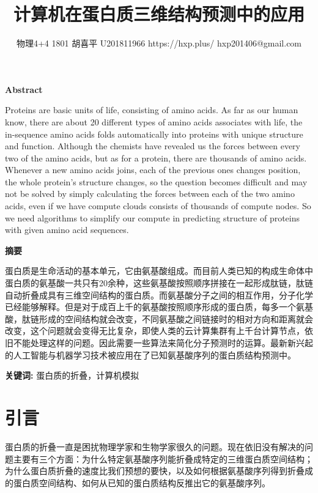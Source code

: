 \documentclass{article}
\author{物理4+4 1801 \quad 胡喜平 \quad U201811966 \quad https://hxp.plus/ \quad hxp201406@gmail.com}}
\date{}
\title{计算机在蛋白质三维结构预测中的应用}
\providecommand{\keywords}[1]
{
  \textbf{关键词:} #1
}
\begin{document}
\maketitle
\begin{center}
  \Large\textbf{Abstract}
\end{center}

Proteins are basic units of life, consisting of amino acids. As far as our human know, there are about 20 different types of amino acids associates with life, the in-sequence amino acids folds automatically into proteins with unique structure and function. Although the chemists have revealed us the forces between every two of the amino acids, but as for a protein, there are thousands of amino acids. Whenever a new amino acids joins, each of the previous ones changes position, the whole protein's structure changes, so the question becomes difficult and may not be solved by simply calculating the forces between each of the two amino acids, even if we have compute clouds consists of thousands of compute nodes. So we need algorithms to simplify our compute in predicting structure of proteins with given amino acid sequences.

\begin{center}
  \Large\textbf{摘要}
\end{center}

蛋白质是生命活动的基本单元，它由氨基酸组成。而目前人类已知的构成生命体中蛋白质的氨基酸一共只有20余种，这些氨基酸按照顺序拼接在一起形成肽链，肽链自动折叠成具有三维空间结构的蛋白质。而氨基酸分子之间的相互作用，分子化学已经能够解释。但是对于成百上千的氨基酸按照顺序形成的蛋白质，每多一个氨基酸，肽链形成的空间结构就会改变，不同氨基酸之间链接时的相对方向和距离就会改变，这个问题就会变得无比复杂，即使人类的云计算集群有上千台计算节点，依旧不能处理这样的问题。因此需要一些算法来简化分子预测时的运算。最新新兴起的人工智能与机器学习技术被应用在了已知氨基酸序列的蛋白质结构预测中。
\newline\newline
\noindent\!\!\!\!
\keywords{蛋白质的折叠，计算机模拟}

\section{引言}

蛋白质的折叠一直是困扰物理学家和生物学家很久的问题。现在依旧没有解决的问题主要有三个方面：为什么特定氨基酸序列能折叠成特定的三维蛋白质空间结构；为什么蛋白质折叠的速度比我们预想的要快，以及如何根据氨基酸序列得到折叠成的蛋白质空间结构、如何从已知的蛋白质结构反推出它的氨基酸序列。
\end{document}
